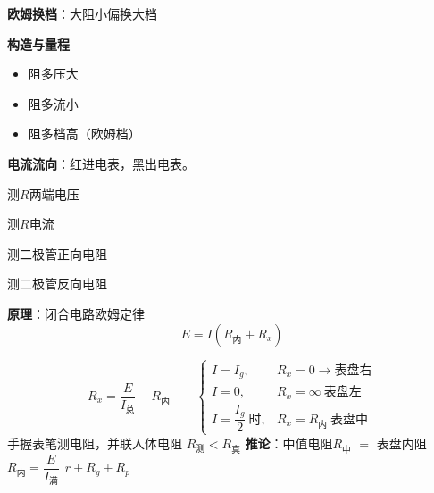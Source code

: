 \textbf{欧姆换档}：大阻小偏换大档

\textbf{构造与量程}
\begin{itemize}
\item 阻多压大
\item 阻多流小
\item 阻多档高（欧姆档）
\end{itemize}
\textbf{电流流向}：红进电表，黑出电表。

\begin{center}
\begin{minipage}[t]{0.23\linewidth}\centering
测$R$两端电压
\end{minipage}\hfill
\begin{minipage}[t]{0.23\linewidth}\centering
测$R$电流
\end{minipage}\hfill
\begin{minipage}[t]{0.23\linewidth}\centering
测二极管正向电阻
\end{minipage}\hfill
\begin{minipage}[t]{0.23\linewidth}\centering
测二极管反向电阻
\end{minipage}
\end{center}
\textbf{原理}：闭合电路欧姆定律
\[
E=I(R_{\text{内}}+R_x)
\]


\[
R_x=\frac{E}{I_{\text{总}}}-R_{\text{内}}
\qquad
\begin{cases}
I=I_g, & R_x=0\to\text{表盘右}\\
I=0, & R_x=\infty\ \text{表盘左}\\
I=\dfrac{I_g}{2}\ \text{时}, & R_x=R_{\text{内}}\ \text{表盘中}
\end{cases}
\]
手握表笔测电阻，并联人体电阻 $R_{\text{测}}<R_{\text{真}}$
\textbf{推论}：中值电阻$R_{\text{中}}$ $=$ 表盘内阻 $R_{\text{内}}=\dfrac{E}{I_{\text{满}}}\ \ r+R_g+R_p$

